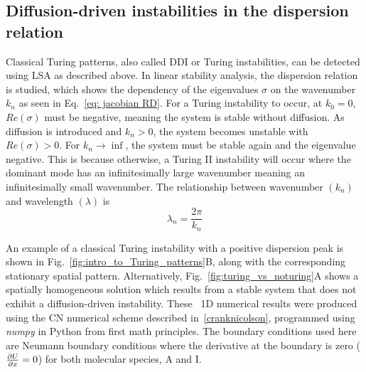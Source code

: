 \subsection{Diffusion-driven instabilities in the dispersion relation}
Classical Turing patterns, also called \acrfull{DDI} or Turing instabilities, can be detected using LSA as described above.
In linear stability analysis, the dispersion relation is studied, which shows the dependency of the eigenvalues $\sigma$ on the wavenumber $k_{n}$ as seen in Eq.~\ref{eq: jacobian RD}.
For a Turing instability to occur, at $k_{0}=0$, $Re(\sigma)$ must be negative, meaning the system is stable without diffusion.
As diffusion is introduced and $k_n>0$, the system becomes unstable with $Re(\sigma)>0$.
For $k_n \rightarrow \inf$, the system must be stable again and the eigenvalue negative.
This is because otherwise, a Turing II instability will occur where the dominant mode has an infinitesimally large wavenumber meaning an infinitesimally small wavenumber.
The relationship between wavenumber $(k_{n})$ and wavelength $(\lambda)$ is
\begin{equation}
    \lambda_n = \frac{2 \pi}{k_n}
    \label{eq:wavelength_wavenumber}
\end{equation}

An example of a classical Turing instability with a positive dispersion peak is shown in Fig.~\ref{fig:intro_to_Turing_patterns}B, along with the corresponding stationary spatial pattern.
Alternatively, Fig.~\ref{fig:turing_vs_noturing}A shows a spatially homogeneous solution which results from a stable system that does not exhibit a diffusion-driven instability.
These ~\acrfull{1D} numerical results were produced using the \acrfull{CN} numerical scheme described in~\ref{cranknicolson}, programmed using \textit{numpy} in Python from first math principles.
The boundary conditions used here are Neumann boundary conditions where the derivative at the boundary is zero ($\pdv{U}{x}=0$) for both molecular species, A and I.

